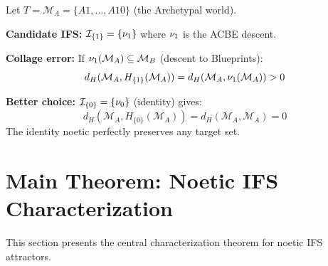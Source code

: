 \begin{example}
\label{ex:collage-world}
Let $T = \mathcal{M}_A = \{A1, \ldots, A10\}$ (the Archetypal world).

\textbf{Candidate IFS:} $\mathcal{I}_{\{1\}} = \{\nu_{1}\}$ where $\nu_{1}$ is the ACBE descent.

\textbf{Collage error:} If $\nu_{1}(\mathcal{M}_A) \subseteq \mathcal{M}_B$ (descent to Blueprints):
\[
d_H(\mathcal{M}_A, H_{\{1\}}(\mathcal{M}_A)) = d_H(\mathcal{M}_A, \nu_{1}(\mathcal{M}_A)) > 0
\]

\textbf{Better choice:} $\mathcal{I}_{\{0\}} = \{\nu_{0}\}$ (identity) gives:
\[
d_H(\mathcal{M}_A, H_{\{0\}}(\mathcal{M}_A)) = d_H(\mathcal{M}_A, \mathcal{M}_A) = 0
\]
The identity noetic perfectly preserves any target set.
\end{example}

\section{Main Theorem: Noetic IFS Characterization}
\label{sec:noetic-ifs-characterization}

\begin{tcolorbox}[colback=green!5!white,colframe=green!75!black,title=\textbf{Chapter Main Result}]
This section presents the central characterization theorem for noetic IFS attractors.
\end{tcolorbox}

